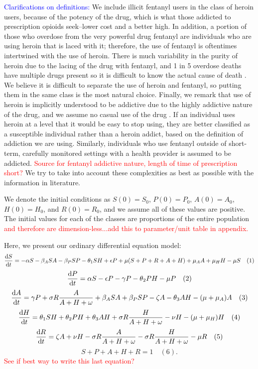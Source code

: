 \documentclass[12pt]{article}
\begin{document}
\textcolor{blue}{Clarifications on definitions:}
We include illicit fentanyl users in the class of heroin users, because of the potency of the drug, which is what those addicted to prescription opioids seek--lower cost and a better high. In addition, a portion of those who overdose from the very powerful drug fentanyl are individuals who are using heroin that is laced with it; therefore, the use of fentanyl is oftentimes intertwined with the use of heroin. There is much variability in the purity of heroin due to the lacing of the drug with fentanyl, and 1 in 5 overdose deaths have multiple drugs present so it is difficult to know the actual cause of death \cite{CDC4}. We believe it is difficult to separate the use of heroin and fentanyl, so putting them in the same class is the most natural choice. Finally, we remark that use of heroin is implicitly understood to be addictive due to the highly addictive nature of the drug, and we assume no casual use of the drug \cite{NIH1}. If an individual uses heroin at a level that it would be easy to stop using, they are better classified as a susceptible individual rather than a heroin addict, based on the definition of addiction we are using. Similarly, individuals who use fentanyl outside of short-term, carefully monitored settings with a health provider is assumed to be addicted. \textcolor{red}{Source for fentanyl addictive nature, length of time of prescription short?} We try to take into account these complexities as best as possible with the information in literature.

We denote the initial conditions as
$S(0)=S_{0}$, $P(0)=P_{0}$, $A(0)=A_{0}$, $H(0)=H_{0}$, and $R(0)=R_{0}$, and we assume all of these values are positive. The initial values for each of the classes are proportions of the entire population \textcolor{red}{and therefore are dimension-less...add this to parameter/unit table in appendix.}

 
Here, we present our ordinary differential equation model:
\[\dv{S}{t} = -\alpha S - \beta_{A} SA  -\beta_{P} SP- \theta_{1} SH +\epsilon P +\mu (S+P+R+A+H) + \mu_{A}A + \mu_{H} H -\mu S \quad (1)\] 
\[\dv{P}{t} = \alpha S - \epsilon P  - \gamma P - \theta_{2}PH- \mu P    \quad(2)\]
\[\dv{A}{t} = \gamma P + \sigma R \frac{A}{A+H+\omega} +\beta_{A} SA  +\beta_{P} SP -\zeta A - \theta_{3}AH-(\mu + \mu_{A})A   \quad (3)\]
\[\dv{H}{t} = \theta_{1}SH+\theta_{2}PH+\theta_{3}AH + \sigma R \frac{H}{A+H+\omega}-\nu H-(\mu+\mu_{H})H  \quad (4)\]
\[\dv{R}{t} = \zeta A +\nu H -\sigma R \frac{A}{A+H+\omega}-\sigma R \frac{H}{A+H+\omega} -\mu R\quad(5)\]
\vspace{.05cm}
\[S+P+A+H+R=1 \quad(6).\]
\textcolor{red}{See if best way to write this last equation?}
\end{document}
